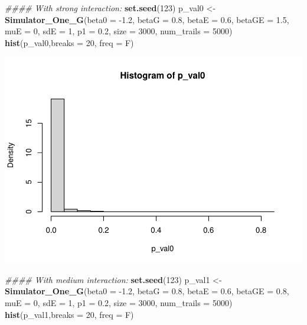\documentclass[
]{article}
\newenvironment{Shaded}{\begin{snugshade}}{\end{snugshade}}
\newcommand{\CommentTok}[1]{\textcolor[rgb]{0.56,0.35,0.01}{\textit{#1}}}
\newcommand{\DataTypeTok}[1]{\textcolor[rgb]{0.13,0.29,0.53}{#1}}
\newcommand{\DecValTok}[1]{\textcolor[rgb]{0.00,0.00,0.81}{#1}}
\newcommand{\FloatTok}[1]{\textcolor[rgb]{0.00,0.00,0.81}{#1}}
\newcommand{\KeywordTok}[1]{\textcolor[rgb]{0.13,0.29,0.53}{\textbf{#1}}}
\newcommand{\NormalTok}[1]{#1}
\newcommand{\StringTok}[1]{\textcolor[rgb]{0.31,0.60,0.02}{#1}}
\begin{document}
\begin{Shaded}
\begin{Highlighting}[]
\CommentTok{#### With strong interaction:}
\KeywordTok{set.seed}\NormalTok{(}\DecValTok{123}\NormalTok{)}
\NormalTok{p_val0 <-}\StringTok{ }\KeywordTok{Simulator_One_G}\NormalTok{(}\DataTypeTok{beta0 =} \FloatTok{-1.2}\NormalTok{, }\DataTypeTok{betaG =} \FloatTok{0.8}\NormalTok{, }\DataTypeTok{betaE =} \FloatTok{0.6}\NormalTok{, }\DataTypeTok{betaGE =} \FloatTok{1.5}\NormalTok{, }\DataTypeTok{muE =} \DecValTok{0}\NormalTok{, }\DataTypeTok{sdE =} \DecValTok{1}\NormalTok{, }\DataTypeTok{p1 =} \FloatTok{0.2}\NormalTok{, }\DataTypeTok{size =} \DecValTok{3000}\NormalTok{, }\DataTypeTok{num_trails =} \DecValTok{5000}\NormalTok{)}
\KeywordTok{hist}\NormalTok{(p_val0,}\DataTypeTok{breaks =} \DecValTok{20}\NormalTok{, }\DataTypeTok{freq =}\NormalTok{ F)}
\end{Highlighting}
\end{Shaded}

\includegraphics{stats-gene-research-progress-v4_files/figure-latex/unnamed-chunk-1-1.pdf}

\begin{Shaded}
\begin{Highlighting}[]
\CommentTok{#### With medium interaction:}
\KeywordTok{set.seed}\NormalTok{(}\DecValTok{123}\NormalTok{)}
\NormalTok{p_val1 <-}\StringTok{ }\KeywordTok{Simulator_One_G}\NormalTok{(}\DataTypeTok{beta0 =} \FloatTok{-1.2}\NormalTok{, }\DataTypeTok{betaG =} \FloatTok{0.8}\NormalTok{, }\DataTypeTok{betaE =} \FloatTok{0.6}\NormalTok{, }\DataTypeTok{betaGE =} \FloatTok{0.8}\NormalTok{, }\DataTypeTok{muE =} \DecValTok{0}\NormalTok{, }\DataTypeTok{sdE =} \DecValTok{1}\NormalTok{, }\DataTypeTok{p1 =} \FloatTok{0.2}\NormalTok{, }\DataTypeTok{size =} \DecValTok{3000}\NormalTok{, }\DataTypeTok{num_trails =} \DecValTok{5000}\NormalTok{)}
\KeywordTok{hist}\NormalTok{(p_val1,}\DataTypeTok{breaks =} \DecValTok{20}\NormalTok{, }\DataTypeTok{freq =}\NormalTok{ F)}
\end{Highlighting}
\end{Shaded}
\end{document}
